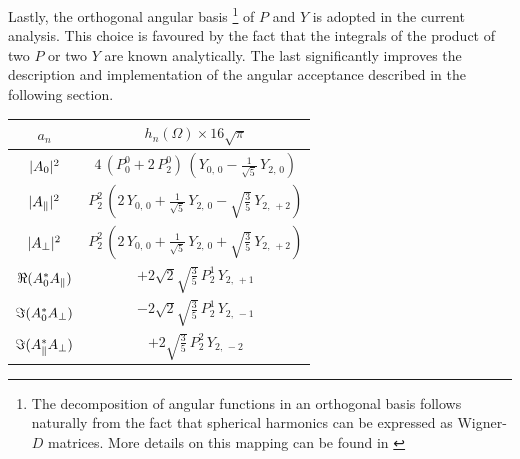 Lastly, the orthogonal angular basis
\footnote{The decomposition of angular functions in an orthogonal basis follows naturally from the fact that spherical
harmonics can be expressed as Wigner-$D$ matrices. More details on this mapping can be found in \cite{jeroenThesis} }
of $P$ and $Y$ is adopted in the current analysis. This choice is favoured by the fact that the integrals
of the product of two $P$ or two $Y$ are known analytically. The last significantly improves the description and implementation
of the angular acceptance described in the following section.

\begin{table}[t]
  \centering
  \renewcommand{\arraystretch}{1.2}
  \begin{tabular}{cc}
    \hline
      $a_n$  &
      $h_n(\Omega) \times 16\sqrt{\pi}$       \\ %

    \hline
      $|{A}_{0}|^2$   &
      $4\, (P_0^0 + 2\, P_2^0)\, (Y_{0,\,0} - \tfrac{1}{\sqrt{5}}\, Y_{2,\,0})$  \\ %

    $|{A}_{\parallel}|^2$  &
      $P_2^2\, (2\, Y_{0,\,0} + \tfrac{1}{\sqrt{5}}\, Y_{2,\,0} - \sqrt{\tfrac{3}{5}}\, Y_{2,\,+2})$ \\ %

    $|{A}_{\perp}|^2$  &
      $P_2^2\, (2\, Y_{0,\,0} + \tfrac{1}{\sqrt{5}}\, Y_{2,\,0} + \sqrt{\tfrac{3}{5}}\, Y_{2,\,+2})$  \\ %

    $\Re({A}_{0}^* {A}_{\parallel})$  &
      $+2\sqrt{2}\sqrt{\tfrac{3}{5}}\, P_2^1\, Y_{2,\,+1}$  \\ %

    $\Im({A}_{0}^* {A}_{\perp})$  &
      $-2\sqrt{2}\sqrt{\tfrac{3}{5}}\, P_2^1\, Y_{2,\,-1}$  \\ %


    $\Im({A}_{\parallel}^* {A}_{\perp})$  &
      $+2\sqrt{\tfrac{3}{5}}\, P_2^2\, Y_{2,\,-2}$  \\ %


\end{tabular}
\end{table}
